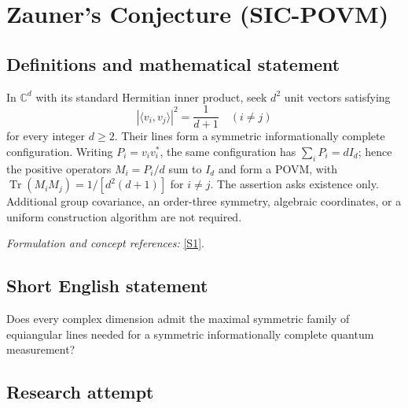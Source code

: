 \documentclass[11pt,a4paper]{article}
\newcommand{\C}{\mathbb{C}}
\newcommand{\sref}[2]{\hyperlink{source:#1:#2}{[S#2]}}
\newif\ifshowcatalogue
\newcommand{\cataloguescope}[1]{\ifshowcatalogue
 \paragraph{Exact scope in the supplied catalogue.}
 \begin{quote}\small #1\end{quote}\fi}
\numberwithin{equation}{section}
\begin{document}
\setcounter{section}{0}
\clearpage
\section*{\texorpdfstring{Zauner's Conjecture (SIC-POVM)}{Zauner's Conjecture (SIC-POVM)}}\label{statement}
\subsection{Definitions and mathematical statement}
In $\C^d$ with its standard Hermitian inner product, seek $d^2$ unit vectors satisfying
\[
 |\langle v_i,v_j\rangle|^2=\frac1{d+1}\quad(i\ne j)
\]
for every integer $d\ge2$. Their lines form a symmetric informationally complete configuration. Writing $P_i=v_iv_i^*$, the same configuration has
$\sum_iP_i=dI_d$; hence the positive operators $M_i=P_i/d$ sum to $I_d$ and form a POVM, with
$\operatorname{Tr}(M_iM_j)=1/[d^2(d+1)]$ for $i\ne j$. The assertion asks existence only. Additional group covariance, an order-three symmetry, algebraic coordinates, or a uniform construction algorithm are not required.
\par\smallskip\textit{Formulation and concept references:} \sref{statement}{1}.
\cataloguescope{Decide whether for EVERY integer d>=2 there exist d\textasciicircum{}2 unit vectors v\_1,...,v\_(d\textasciicircum{}2) in the standard complex Hilbert space C\textasciicircum{}d with |<v\_i,v\_j>|\textasciicircum{}2=1/(d+1) whenever i!=j. Their complex lines are distinct. Equivalently, their rank-one projectors P\_i=v\_i v\_i\textasciicircum{}* have sum\_i P\_i=d I\_d and define SIC-POVM elements M\_i=P\_i/d; for i!=j the normalized trace is Tr(M\_i M\_j)=1/[d\textasciicircum{}2(d+1)]. No Weyl-Heisenberg covariance, order-three symmetry, explicit coordinates or uniform construction algorithm is imposed.}
\subsection{Short English statement}
Does every complex dimension admit the maximal symmetric family of equiangular lines needed for a symmetric informationally complete quantum measurement?
\subsection{Research attempt}
\end{document}
